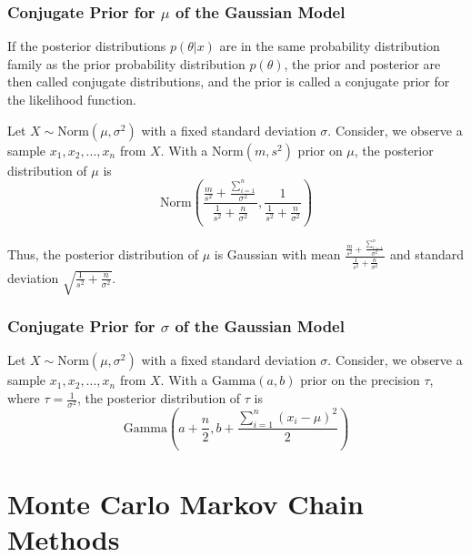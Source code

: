 \documentclass[11pt]{article}
\begin{document}
\subsubsection{Conjugate Prior for $\mu$ of the Gaussian Model}
If the posterior distributions $p(\theta | x)$ are in the same probability distribution family as the prior probability distribution $p(\theta)$, the prior and posterior are then called conjugate distributions, and the prior is called a conjugate prior for the likelihood function.

Let $X \sim \text{Norm}(\mu,\sigma^2)$ with a fixed standard deviation $\sigma$. Consider, we observe a sample $x_1 ,x_2 ,...,x_n$ from $X$. With a $\text{Norm}(m,s^2)$ prior on $\mu$, the posterior distribution of $\mu$ is
\begin{equation*}
	\text{Norm}\left(\frac{ \frac{m}{s^2} + \frac{ \sum_{i=1}^{n} }{ \sigma^2 } }{ \frac{1}{s^2} + \frac{n}{\sigma^2} } , \frac{1}{\frac{1}{s^2} + \frac{n}{\sigma^2}}\right)
\end{equation*}

Thus, the posterior distribution of $\mu$ is Gaussian with mean $\frac{ \frac{m}{s^2} + \frac{ \sum_{i=1}^{n} }{ \sigma^2 } }{ \frac{1}{s^2} + \frac{n}{\sigma^2} }$ and standard deviation $\sqrt{\frac{1}{s^2} + \frac{n}{\sigma^2}}$.

\subsubsection{Conjugate Prior for $\sigma$ of the Gaussian Model}
Let $X \sim \text{Norm}(\mu,\sigma^2)$ with a fixed standard deviation $\sigma$. Consider, we observe a sample $x_1 ,x_2 ,...,x_n$ from $X$. With a $\text{Gamma}(a,b)$ prior on the precision $\tau$, where $\tau = \frac{1}{\sigma^2}$, the posterior distribution of $\tau$ is
\begin{equation*}
	\text{Gamma}\left( a+\frac{n}{2}, b + \frac{\sum_{i=1}^{n} (x_i - \mu)^2 }{2} \right)
\end{equation*}

\section{Monte Carlo Markov Chain Methods}
\end{document}
